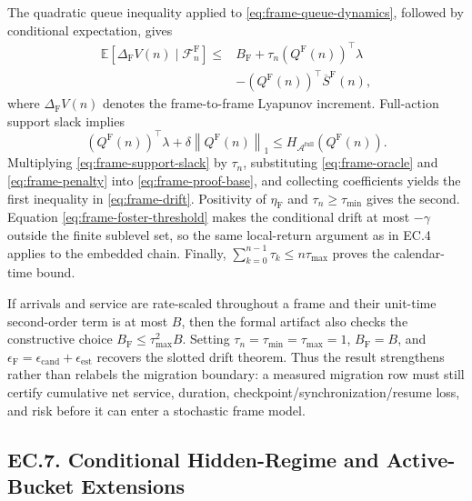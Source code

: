 \documentclass[opre,dblanonrev]{informs4}
\newcommand{\Afull}{\mathcal A^{\mathrm{full}}}
\newcommand{\E}{\mathbb E}
\newcommand{\normone}[1]{\left\|#1\right\|_1}
\begin{document}
The quadratic queue inequality applied to
\eqref{eq:frame-queue-dynamics}, followed by conditional expectation, gives
\begin{equation}
  \begin{aligned}
  \E[\Delta_{\mathrm F}V(n)\mid\mathcal F_n^{\mathrm F}]
  \le{}& B_{\mathrm F}
  +\tau_n\left(Q^{\mathrm F}(n)\right)^{\!\top}\lambda\\
  &-\left(Q^{\mathrm F}(n)\right)^{\!\top}
    \overline S^{\mathrm F}(n),
  \end{aligned}
  \label{eq:frame-proof-base}
\end{equation}
where \(\Delta_{\mathrm F}V(n)\) denotes the frame-to-frame Lyapunov increment.
Full-action support slack implies
\begin{equation}
  \left(Q^{\mathrm F}(n)\right)^{\!\top}\lambda
  +\delta\normone{Q^{\mathrm F}(n)}
  \le H_{\Afull}\!\left(Q^{\mathrm F}(n)\right).
  \label{eq:frame-support-slack}
\end{equation}
Multiplying \eqref{eq:frame-support-slack} by \(\tau_n\), substituting
\eqref{eq:frame-oracle} and \eqref{eq:frame-penalty} into
\eqref{eq:frame-proof-base}, and collecting coefficients yields the first
inequality in \eqref{eq:frame-drift}.  Positivity of \(\eta_{\mathrm F}\) and
\(\tau_n\ge\tau_{\min}\) gives the second.  Equation
\eqref{eq:frame-foster-threshold} makes the conditional drift at most
\(-\gamma\) outside the finite sublevel set, so the same local-return argument
as in EC.4 applies to the embedded chain.  Finally,
\(\sum_{k=0}^{n-1}\tau_k\le n\tau_{\max}\) proves the calendar-time bound.
\endproof

If arrivals and service are rate-scaled throughout a frame and their unit-time
second-order term is at most \(B\), then the formal artifact also checks the
constructive choice \(B_{\mathrm F}\le\tau_{\max}^2B\).  Setting
\(\tau_n=\tau_{\min}=\tau_{\max}=1\),
\(B_{\mathrm F}=B\), and
\(\epsilon_{\mathrm F}=\epsilon_{\mathrm{cand}}+\epsilon_{\mathrm{est}}\)
recovers the slotted drift theorem.  Thus the result strengthens rather than
relabels the migration boundary: a measured migration row must still certify
cumulative net service, duration, checkpoint/synchronization/resume loss, and
risk before it can enter a stochastic frame model.

\subsection*{EC.7. Conditional Hidden-Regime and Active-Bucket Extensions}
\end{document}
